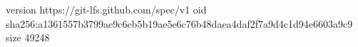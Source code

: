 version https://git-lfs.github.com/spec/v1
oid sha256:a1361557b3799ae9c6eb5b19ae5e6c76b48daea4daf2f7a9d4c1d94e6603a9c9
size 49248
